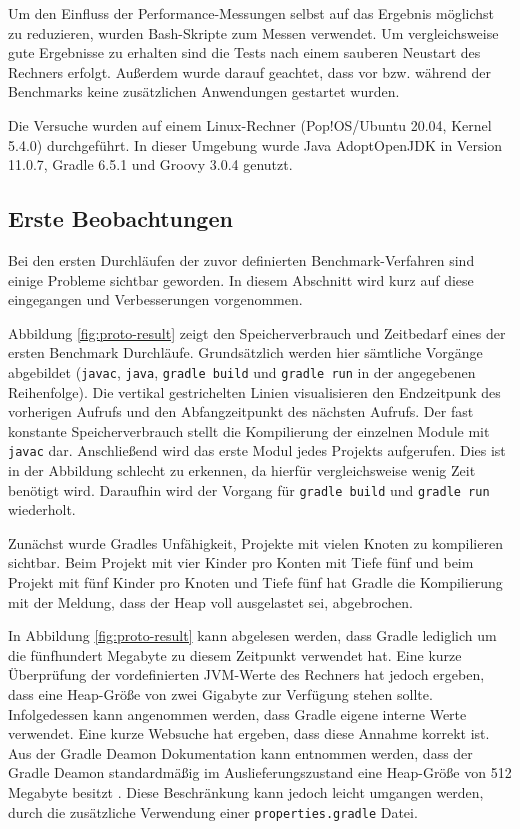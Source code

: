 Um den Einfluss der Performance-Messungen selbst auf das Ergebnis möglichst zu reduzieren, wurden Bash-Skripte zum Messen verwendet.
Um vergleichsweise gute Ergebnisse zu erhalten sind die Tests nach einem sauberen Neustart des Rechners erfolgt.
Außerdem wurde darauf geachtet, dass vor bzw. während der Benchmarks keine zusätzlichen Anwendungen gestartet wurden.

Die Versuche wurden auf einem Linux-Rechner (Pop!OS/Ubuntu 20.04, Kernel 5.4.0) durchgeführt.
In dieser Umgebung wurde Java AdoptOpenJDK in Version 11.0.7, Gradle 6.5.1 und Groovy 3.0.4 genutzt.


\subsection{Erste Beobachtungen}
Bei den ersten Durchläufen der zuvor definierten Benchmark-Verfahren sind einige Probleme sichtbar geworden. 
In diesem Abschnitt wird kurz auf diese eingegangen und Verbesserungen vorgenommen.

Abbildung \ref{fig:proto-result} zeigt den Speicherverbrauch und Zeitbedarf eines der ersten Benchmark Durchläufe.
Grundsätzlich werden hier sämtliche Vorgänge abgebildet (\texttt{javac}, \texttt{java}, \texttt{gradle build} und \texttt{gradle run} in der angegebenen Reihenfolge).
Die vertikal gestrichelten Linien visualisieren den Endzeitpunk des vorherigen Aufrufs und den Abfangzeitpunkt des nächsten Aufrufs.
Der fast konstante Speicherverbrauch stellt die Kompilierung der einzelnen Module mit \texttt{javac} dar.
Anschließend wird das erste Modul jedes Projekts aufgerufen. 
Dies ist in der Abbildung schlecht zu erkennen, da hierfür vergleichsweise wenig Zeit benötigt wird.
Daraufhin wird der Vorgang für \texttt{gradle build} und \texttt{gradle run} wiederholt.

Zunächst wurde Gradles Unfähigkeit, Projekte mit vielen Knoten zu kompilieren sichtbar.
Beim Projekt mit vier Kinder pro Konten mit Tiefe fünf und beim Projekt mit fünf Kinder pro Knoten und Tiefe fünf hat Gradle die Kompilierung mit der Meldung, dass der Heap voll ausgelastet sei, abgebrochen.

In Abbildung \ref{fig:proto-result} kann abgelesen werden, dass Gradle lediglich um die fünfhundert Megabyte zu diesem Zeitpunkt verwendet hat.
Eine kurze Überprüfung der vordefinierten JVM-Werte des Rechners hat jedoch ergeben, dass eine Heap-Größe von zwei Gigabyte zur Verfügung stehen sollte.
Infolgedessen kann angenommen werden, dass Gradle eigene interne Werte verwendet.
Eine kurze Websuche hat ergeben, dass diese Annahme korrekt ist.
Aus der Gradle Deamon Dokumentation kann entnommen werden, dass der Gradle Deamon standardmäßig im Auslieferungszustand eine Heap-Größe von 512 Megabyte besitzt \cite{gradle-memory}.
Diese Beschränkung kann jedoch leicht umgangen werden, durch die zusätzliche Verwendung einer \texttt{properties.gradle} Datei.


